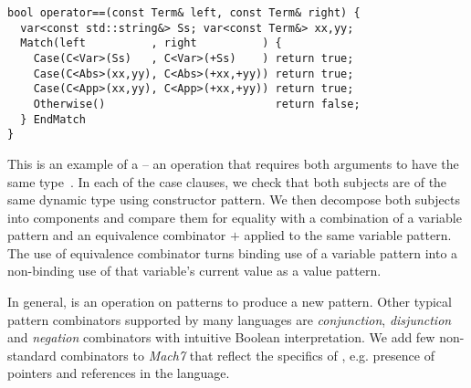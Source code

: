 \begin{lstlisting}[columns=flexible]
bool operator==(const Term& left, const Term& right) {
  var<const std::string&> Ss; var<const Term&> xx,yy;
  Match(left          , right          ) {
    Case(C<Var>(Ss)   , C<Var>(+Ss)    ) return true;
    Case(C<Abs>(xx,yy), C<Abs>(+xx,+yy)) return true;
    Case(C<App>(xx,yy), C<App>(+xx,+yy)) return true;
    Otherwise()                          return false;
  } EndMatch
}
\end{lstlisting}

\noindent
This \code{==} is an example of a  -- an operation that 
requires both arguments to have the same type~\cite{BCCLP95}. In each of the 
case clauses, we check that both subjects are of the same dynamic type using 
constructor pattern. We then decompose both subjects into 
components and compare them for equality with a combination of a variable pattern 
and an equivalence combinator $+$ applied to the same variable pattern. The use 
of equivalence combinator turns binding use of a variable pattern into a 
non-binding use of that variable's current value as a value pattern.

In general,  is an operation on patterns to produce a 
new pattern. Other typical pattern combinators supported by many languages are
\emph{conjunction}, \emph{disjunction} and \emph{negation} combinators with 
intuitive Boolean interpretation. We add few non-standard combinators to 
\emph{Mach7} that reflect the specifics of \Cpp{}, e.g. presence of pointers and 
references in the language.

